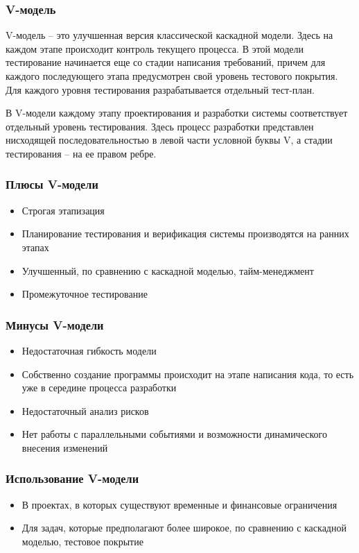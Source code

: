 \documentclass{../industrial-development}
\begin{document}
\begin{frame} \frametitle{V-модель}
\begin{flushleft}
V-модель – это улучшенная версия классической каскадной модели. Здесь на каждом этапе происходит контроль текущего процесса. В этой модели тестирование начинается еще со стадии написания требований, причем для каждого последующего этапа предусмотрен свой уровень тестового покрытия. Для каждого уровня тестирования разрабатывается отдельный тест-план.

В V-модели каждому этапу проектирования и разработки системы соответствует отдельный уровень тестирования. Здесь процесс разработки представлен нисходящей последовательностью в левой части условной буквы V, а стадии тестирования – на ее правом ребре.
\end{flushleft}
\end{frame}

\begin{frame} \frametitle{Плюсы V-модели}
\begin{itemize}
	\item Строгая этапизация
	\item Планирование тестирования и верификация системы производятся на ранних этапах
	\item Улучшенный, по сравнению с каскадной моделью, тайм-менеджмент
	\item Промежуточное тестирование
\end{itemize}
\end{frame}

\begin{frame} \frametitle{Минусы V-модели}
\begin{itemize}
	\item Недостаточная гибкость модели
	\item Собственно создание программы происходит на этапе написания кода, то есть уже в середине процесса разработки
	\item Недостаточный анализ рисков
	\item Нет работы с параллельными событиями и возможности динамического внесения изменений
\end{itemize}
\end{frame}

\begin{frame} \frametitle{Использование V-модели}
\begin{itemize}
	\item В проектах, в которых существуют временные и финансовые ограничения
	\item Для задач, которые предполагают более широкое, по сравнению с каскадной моделью, тестовое покрытие
\end{itemize}
\end{frame}
\end{document}
